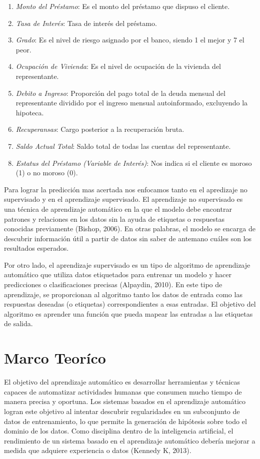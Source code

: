 \documentclass[a4paper,12pt]{article}
\begin{document}
\begin{enumerate}
    \item \emph{Monto del Préstamo}: Es el monto del préstamo que dispuso el cliente.
    \item \emph{Tasa de Interés}: Tasa de interés del préstamo.
    \item \emph{Grado}: Es el nivel de riesgo asignado por el banco, siendo 1 el mejor y 7 el peor.
    \item \emph{Ocupación de Vivienda}: Es el nivel de ocupación de la vivienda del representante.
    \item \emph{Debito a Ingreso}: Proporción del pago total de la deuda mensual del representante dividido por el ingreso mensual autoinformado, excluyendo la hipoteca.
    \item \emph{Recuperansas}: Cargo posterior a la recuperación bruta.
    \item \emph{Saldo Actual Total}: Saldo total de todas las cuentas del representante.
    \item \emph{Estatus del Préstamo (Variable de Interés)}: Nos indica si el cliente es moroso (1) o no moroso (0).
\end{enumerate}

Para lograr la predicción mas acertada nos enfocamos tanto en el apredizaje no supervisado y en el aprendizaje supervisado. El aprendizaje no supervisado es una técnica de aprendizaje automático en la que el modelo debe encontrar patrones y relaciones en los datos sin la ayuda de etiquetas o respuestas conocidas previamente (Bishop, 2006). En otras palabras, el modelo se encarga de descubrir información útil a partir de datos sin saber de antemano cuáles son los resultados esperados.

Por otro lado, el aprendizaje supervisado es un tipo de algoritmo de aprendizaje automático que utiliza datos etiquetados para entrenar un modelo y hacer predicciones o clasificaciones precisas (Alpaydin, 2010). En este tipo de aprendizaje, se proporcionan al algoritmo tanto los datos de entrada como las respuestas deseadas (o etiquetas) correspondientes a esas entradas. El objetivo del algoritmo es aprender una función que pueda mapear las entradas a las etiquetas de salida.


\section{Marco Teoríco}

El objetivo del aprendizaje automático es desarrollar herramientas y técnicas capaces de automatizar actividades humanas que consumen mucho tiempo de manera precisa y oportuna. Los sistemas basados en el aprendizaje automático logran este objetivo al intentar descubrir regularidades en un subconjunto de datos de entrenamiento, lo que permite la generación de hipótesis sobre todo el dominio de los datos. Como disciplina dentro de la inteligencia artificial, el rendimiento de un sistema basado en el aprendizaje automático debería mejorar a medida que adquiere experiencia o datos (Kennedy K, 2013).
\end{document}
